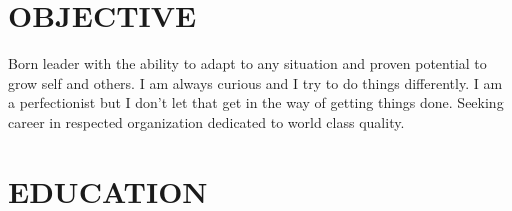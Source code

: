 \documentclass[margin, 12pt]{res} %
\begin{document}
\begin{resume}

 
\section{OBJECTIVE}  

Born leader with the ability to adapt to any situation and proven potential to grow self and others. I am always curious and I try to do things differently. I am a perfectionist but I don’t let that get in the way of getting things done. Seeking career in respected organization dedicated to world class quality.


\section{EDUCATION}


\end{resume}
\end{document}
